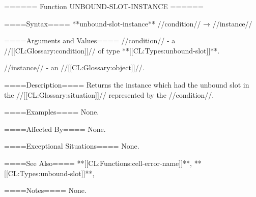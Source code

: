====== Function UNBOUND-SLOT-INSTANCE ======

====Syntax====
**unbound-slot-instance** //condition// → //instance//

====Arguments and Values====
//condition// - a //[[CL:Glossary:condition]]// of type **[[CL:Types:unbound-slot]]**.

//instance// - an //[[CL:Glossary:object]]//.

====Description====
Returns the instance which had the unbound slot in the //[[CL:Glossary:situation]]// represented by the //condition//.

====Examples====
None.

====Affected By====
None.

====Exceptional Situations====
None.

====See Also====
**[[CL:Functions:cell-error-name]]**, **[[CL:Types:unbound-slot]]**,{\secref\ConditionSystemConcepts}

====Notes====
None.

